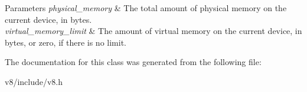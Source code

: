 \begin{DoxyParams}{Parameters}
{\em physical\+\_\+memory} & The total amount of physical memory on the current device, in bytes. \\
\hline
{\em virtual\+\_\+memory\+\_\+limit} & The amount of virtual memory on the current device, in bytes, or zero, if there is no limit. \\
\hline
\end{DoxyParams}


The documentation for this class was generated from the following file\+:\begin{DoxyCompactItemize}
\item 
v8/include/v8.\+h\end{DoxyCompactItemize}
